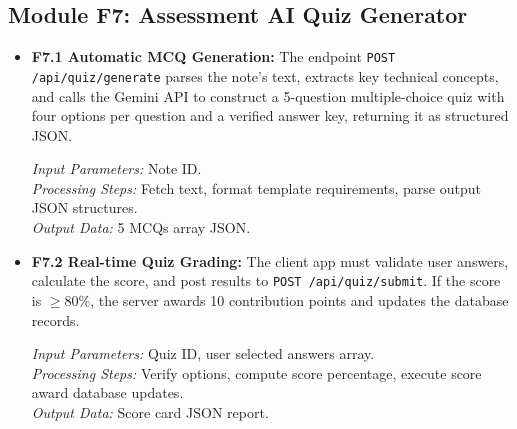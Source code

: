 \documentclass[12,Times new Roman,a4paper]{report}
\begin{document}
\subsection{Module F7: Assessment AI Quiz Generator}
\begin{itemize}
    \item \textbf{F7.1 Automatic MCQ Generation:} The endpoint \texttt{POST /api/quiz/generate} parses the note's text, extracts key technical concepts, and calls the Gemini API to construct a 5-question multiple-choice quiz with four options per question and a verified answer key, returning it as structured JSON.
    
    \textit{Input Parameters:} Note ID. \\
    \textit{Processing Steps:} Fetch text, format template requirements, parse output JSON structures. \\
    \textit{Output Data:} 5 MCQs array JSON.
    
    \item \textbf{F7.2 Real-time Quiz Grading:} The client app must validate user answers, calculate the score, and post results to \texttt{POST /api/quiz/submit}. If the score is $\ge 80\%$, the server awards 10 contribution points and updates the database records.
    
    \textit{Input Parameters:} Quiz ID, user selected answers array. \\
    \textit{Processing Steps:} Verify options, compute score percentage, execute score award database updates. \\
    \textit{Output Data:} Score card JSON report.
\end{itemize}
\end{document}
